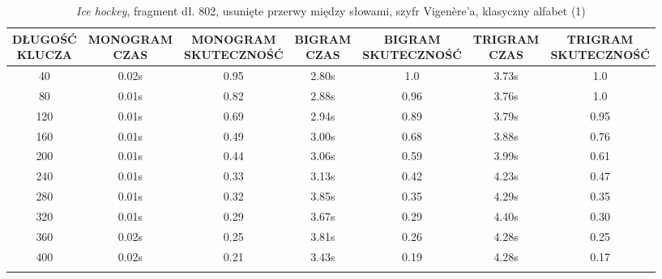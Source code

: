 \documentclass[a4paper]{article}
\theoremstyle{defn}
\theoremstyle{theorem}
\theoremstyle{lemma}
\theoremstyle{cor}
\theoremstyle{fact}
\begin{document}
\begin{center}\begin{small}\begin{longtable}{|c|c|c|c|c|c|c|} 
\hline \makecell{DŁUGOŚĆ\\KLUCZA} &  \makecell{MONOGRAM\\CZAS} & \makecell{MONOGRAM\\SKUTECZNOŚĆ} & \makecell{BIGRAM\\CZAS} &  \makecell{BIGRAM\\SKUTECZNOŚĆ} & \makecell{TRIGRAM\\CZAS} & \makecell{TRIGRAM\\SKUTECZNOŚĆ}\\ \hline 
40 & 0.02s & 0.95 & 2.80s & 1.0 & 3.73s & 1.0 \\ \hline 
80 & 0.01s & 0.82 & 2.88s & 0.96 & 3.76s & 1.0 \\ \hline 
120 & 0.01s & 0.69 & 2.94s & 0.89 & 3.79s & 0.95 \\ \hline 
160 & 0.01s & 0.49 & 3.00s & 0.68 & 3.88s & 0.76 \\ \hline 
200 & 0.01s & 0.44 & 3.06s & 0.59 & 3.99s & 0.61 \\ \hline 
240 & 0.01s & 0.33 & 3.13s & 0.42 & 4.23s & 0.47 \\ \hline 
280 & 0.01s & 0.32 & 3.85s & 0.35 & 4.29s & 0.35 \\ \hline 
320 & 0.01s & 0.29 & 3.67s & 0.29 & 4.40s & 0.30 \\ \hline 
360 & 0.02s & 0.25 & 3.81s & 0.26 & 4.28s & 0.25 \\ \hline 
400 & 0.02s & 0.21 & 3.43s & 0.19 & 4.28s & 0.17 \\ \hline 
\caption{\textit{Ice hockey}, fragment dł. 802, usunięte przerwy między słowami, szyfr Vigenère'a, klasyczny alfabet (1)}
\end{longtable}\end{small}\end{center} 
\end{document}
